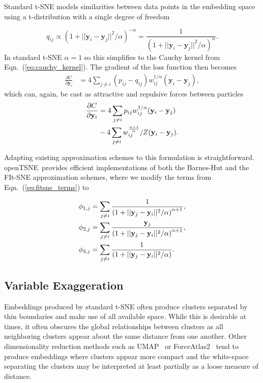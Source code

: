 \documentclass[twocolumn]{bmcart}
\newcommand{\opentsne}{\textsf{openTSNE}}
\begin{document}
Standard t-SNE models similarities between data points in the embedding space
using a t-distribution with a single degree of freedom

\begin{equation}
q_{ij} \propto \left ( 1 + || \mathbf{y}_i - \mathbf{y}_j ||^2 / \alpha \right )^{-\alpha} = \frac{1}{\left( 1 + || \mathbf{y}_i - \mathbf{y}_j ||^2 / \alpha \right)^\alpha }.
\end{equation}
In standard t-SNE $\alpha=1$ so this simplifies to the Cauchy kernel from
Eqn.~(\ref{eq:cauchy_kernel}). The gradient of the loss function then becomes
\begin{align}
\frac{\partial C}{\partial \mathbf{y}_i} &= 4 \sum_{j \neq i} \left ( p_{ij} - q_{ij} \right ) w_{ij}^{1/\alpha} \left ( \mathbf{y}_i - \mathbf{y}_j \right ),
\end{align}
which can, again, be cast as attractive and repulsive forces between particles
\begin{align}
\frac{\partial C}{\partial \mathbf{y}_i} &= 4 \sum_{j \neq i} p_{ij} w_{ij}^{1/\alpha} (\mathbf{y}_i - \mathbf{y}_j) \notag \\
&- 4 \sum_{j \neq i} w_{ij}^{\frac{\alpha+1}{\alpha}} / Z (\mathbf{y}_i - \mathbf{y}_j).
\end{align}

Adapting existing approximation schemes to this formulation is straightforward.
\opentsne\ provides efficient implementations of both the Barnes-Hut and the FIt-SNE
approximation schemes, where we modify the terms from
Eqn.~(\ref{eq:fitsne_terms}) to

\begin{align}
\phi_{1,j} &= \sum_{j \neq i} \frac{1}{\left( 1 + || \mathbf{y}_j - \mathbf{y}_i ||^2 / \alpha \right)^{\alpha+1}}, \notag \\
\phi_{2,j} &= \sum_{j \neq i} \frac{\mathbf{y}_j}{\left( 1 + || \mathbf{y}_j - \mathbf{y}_i ||^2 / \alpha \right)^{\alpha+1}}, \notag \\
\phi_{3,j} &= \sum_{j \neq i} \frac{1}{\left( 1 + || \mathbf{y}_j - \mathbf{y}_i ||^2 / \alpha \right)}. \notag
\end{align}

\subsection*{Variable Exaggeration}

Embeddings produced by standard t-SNE often produce clusters separated by thin
boundaries and make use of all available space. While this is desirable at times,
it often obscures the global relationships between clusters as all
neighboring clusters appear about the same distance from one another. Other
dimensionality reduction methods such as UMAP~\cite{2018arXivUMAP} or
ForceAtlas2~\cite{jacomy2014forceatlas2} tend to produce embeddings where
clusters appear more compact and the white-space separating the clusters may be
interpreted at least partially as a loose measure of distance.
\end{document}
